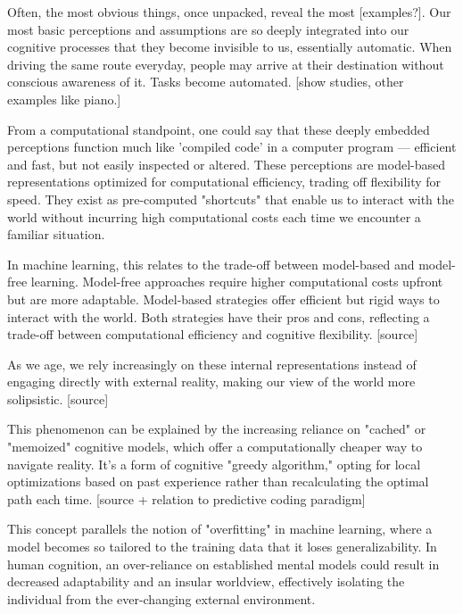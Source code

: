 Often, the most obvious things, once unpacked, reveal the most [examples?]. Our most basic perceptions and assumptions are so deeply integrated into our cognitive processes that they become invisible to us, essentially automatic. When driving the same route everyday, people may arrive at their destination without conscious awareness of it. Tasks become automated. [show studies, other examples like piano.]

From a computational standpoint, one could say that these deeply embedded perceptions function much like 'compiled code' in a computer program — efficient and fast, but not easily inspected or altered. These perceptions are model-based representations optimized for computational efficiency, trading off flexibility for speed. They exist as pre-computed "shortcuts" that enable us to interact with the world without incurring high computational costs each time we encounter a familiar situation.

In machine learning, this relates to the trade-off between model-based and model-free learning. Model-free approaches require higher computational costs upfront but are more adaptable. Model-based strategies offer efficient but rigid ways to interact with the world. Both strategies have their pros and cons, reflecting a trade-off between computational efficiency and cognitive flexibility. [source]

As we age, we rely increasingly on these internal representations instead of engaging directly with external reality, making our view of the world more solipsistic. [source]


This phenomenon can be explained by the increasing reliance on "cached" or "memoized" cognitive models, which offer a computationally cheaper way to navigate reality. It's a form of cognitive "greedy algorithm," opting for local optimizations based on past experience rather than recalculating the optimal path each time. [source + relation to predictive coding paradigm]

This concept parallels the notion of "overfitting" in machine learning, where a model becomes so tailored to the training data that it loses generalizability. In human cognition, an over-reliance on established mental models could result in decreased adaptability and an insular worldview, effectively isolating the individual from the ever-changing external environment.


